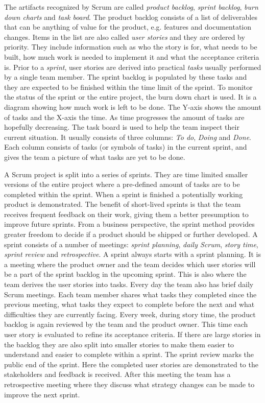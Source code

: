 The artifacts recognized by Scrum are called \textit{product backlog},
\textit{sprint backlog}, \textit{burn down charts} and \textit{task board}. The
product backlog consists of a list of deliverables that can be anything of
value for the product, e.g. features and documentation changes. Items in the
list are also called \textit{user stories} and they are ordered by priority.
They include information such as who the story is for, what needs to be built,
how much work is needed to implement it and what the acceptance criteria is.
Prior to a \textit{sprint}, user stories are derived into practical
\textit{tasks} usually performed by a single team member. The sprint backlog is
populated by these tasks and they are expected to be finished within the time
limit of the sprint. To monitor the status of the sprint or the entire project,
the burn down chart is used. It is a diagram showing how much work is left to
be done.  The Y-axis shows the amount of tasks and the X-axis the time. As time
progresses the amount of tasks are hopefully decreasing. The task board is used
to help the team inspect their current situation. It usually consists of three
columns: \textit{To do}, \textit{Doing} and \textit{Done}. Each column consists
of tasks (or symbols of tasks) in the current sprint, and gives the team a
picture of what tasks are yet to be done. \cite{sims2012scrum}

A Scrum project is split into a series of sprints. They are time limited
smaller versions of the entire project where a pre-defined amount of tasks are
to be completed within the sprint. When a sprint is finished a potentially
working product is demonstrated. The benefit of short-lived sprints is that the
team receives frequent feedback on their work, giving them a better presumption
to improve future sprints. From a business perspective, the sprint method
provides greater freedom to decide if a product should be shipped or further
developed. A sprint consists of a number of meetings: \textit{sprint planning},
\textit{daily Scrum}, \textit{story time}, \textit{sprint review} and
\textit{retrospective}. A sprint always starts with a sprint planning. It is a
meeting where the product owner and the team decides which user stories will be
a part of the sprint backlog in the upcoming sprint. This is also where the
team derives the user stories into tasks. Every day the team also has brief
daily Scrum meetings. Each team member shares what tasks they completed since
the previous meeting, what tasks they expect to complete before the next and
what difficulties they are currently facing. Every week, during story time, the
product backlog is again reviewed by the team and the product owner. This time
each user story is evaluated to refine its acceptance criteria. If there are
large stories in the backlog they are also split into smaller stories to make
them easier to understand and easier to complete within a sprint. The sprint
review marks the public end of the sprint. Here the completed user stories are
demonstrated to the stakeholders and feedback is received. After this meeting
the team has a retrospective meeting where they discuss what strategy changes
can be made to improve the next sprint. \cite{sims2012scrum}


